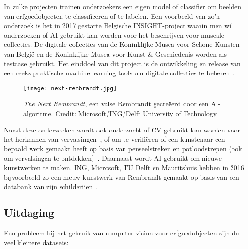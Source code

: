 
In zulke projecten trainen onderzoekers een eigen model of classifier om beelden van erfgoedobjecten te classificeren of te labelen. Een voorbeeld van zo’n onderzoek is het in 2017 gestarte Belgische INSIGHT-project waarin men wil onderzoeken of AI gebruikt kan worden voor het beschrijven voor museale collecties. De digitale collecties van de Koninklijke Musea voor Schone Kunsten van Belgi\"{e} en de Koninklijke Musea voor Kunst \& Geschiedenis worden als testcase gebruikt. Het einddoel van dit project is de ontwikkeling en release van een reeks praktische machine learning tools om digitale collecties te beheren~\autocite{UniAntwerpen2017?}.

\begin{figure}
	\centering
	\texttt{[image: next-rembrandt.jpg]}
	\caption[\textit{The Next Rembrandt}, een valse Rembrandt gecreëerd door een AI-algoritme]{\textit{The Next Rembrandt}, een valse Rembrandt gecreëerd door een AI-algoritme. Credit: Microsoft/ING/Delft University of Technology}
\end{figure}

Naast deze onderzoeken wordt ook onderzocht of CV gebruikt kan worden voor het herkennen van vervalsingen~\autocite{Dickson2018}, of om te verifi\"{e}ren of een kunstenaar een bepaald werk gemaakt heeft op basis van penseelstreken en potloodstrepen (ook om vervalsingen te ontdekken)~\autocite{Elgammal2017}. Daarnaast wordt AI gebruikt om nieuwe kunstwerken te maken\autocite{Dickson2019}. ING, Microsoft, TU Delft en Mauritshuis hebben in 2016 bijvoorbeeld zo een nieuw kunstwerk van Rembrandt gemaakt op basis van een databank van zijn schilderijen~\autocite{ING2016}.

\subsection{Uitdaging}
\label{subsec:cv-voor-ce-uitdaging}

Een probleem bij het gebruik van computer vision voor erfgoedobjecten zijn de veel kleinere datasets: 

